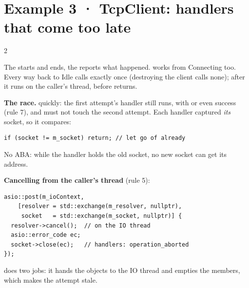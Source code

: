 \section{Example 3 · TcpClient: handlers that come too late \hfill{}}

\begin{multicols}{2}
\begin{diagram}
\end{diagram}
{\small The  starts and ends, the  reports what happened.  works from Connecting too. Every way back to Idle calls  exactly once (destroying the client calls none); after  it runs on the caller's thread, before  returns.}

\columnbreak
\textbf{The race.}  quickly: the first attempt's handler still runs, with  or even success (rule 7), and must not touch the second attempt. Each handler captured \emph{its} socket, so it compares:
\begin{lstlisting}
if (socket != m_socket) return; // let go of already
\end{lstlisting}
No ABA: while the handler holds the old socket, no new socket can get its address.

\textbf{Cancelling from the caller's thread} (rule 5):
\begin{lstlisting}
asio::post(m_ioContext,
    [resolver = std::exchange(m_resolver, nullptr),
     socket   = std::exchange(m_socket, nullptr)] {
  resolver->cancel();  // on the IO thread
  asio::error_code ec;
  socket->close(ec);   // handlers: operation_aborted
});
\end{lstlisting}
 does two jobs: it hands the objects to the IO thread and empties the members, which makes the attempt stale.
\end{multicols}
